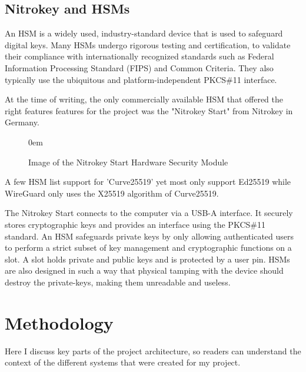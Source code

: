 \documentclass [11pt, proquest] {uwthesis}[2020/02/24]
\begin{document}
\section{Nitrokey and HSMs}
An HSM is a widely used, industry-standard device that is used to safeguard digital keys. Many HSMs undergo rigorous testing and certification, to validate their compliance with internationally recognized standards such as Federal Information Processing Standard (FIPS) and Common Criteria. They also typically use the ubiquitous and platform-independent PKCS\#11 interface. 

At the time of writing, the only commercially available HSM that offered the right features features for the project was the "Nitrokey Start" from Nitrokey in Germany\cite{noauthor_nitrokey_2022}.\begin{figure}
\itemsep0em 
\caption{Image of the Nitrokey Start Hardware Security Module}
\label{img:nitrokey}
\end{figure} A few HSM list support for 'Curve25519' yet most only support Ed25519 while WireGuard only uses the X25519 algorithm of Curve25519.

The Nitrokey Start connects to the computer via a USB-A interface. It securely stores cryptographic keys and provides an interface using the PKCS\#11 standard.
An HSM safeguards private keys by only allowing authenticated users to perform a strict subset of key management and cryptographic functions on a slot. A slot holds private and public keys and is protected by a user pin. HSMs are also designed in such a way that physical tamping with the device should destroy the private-keys, making them unreadable and useless. 


\chapter {Methodology}
Here I discuss key parts of the project architecture, so readers can understand the context of the different systems that were created for my project.
\end{document}
